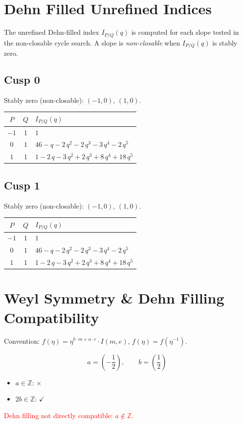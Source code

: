 \documentclass[11pt,a4paper]{article}
\begin{document}
\section{Dehn Filled Unrefined Indices}
The unrefined Dehn-filled index $I_{P/Q}(q)$ is computed for each slope tested in the non-closable cycle search.  A slope is \emph{non-closable} when $I_{P/Q}(q)$ is stably zero.

\subsection*{Cusp 0}
Stably zero (non-closable): $(-1,0)$, $(1,0)$.

\begin{longtable}{ccl}
\toprule
$P$ & $Q$ & $I_{P/Q}(q)$ \\
\midrule
\endhead
$-1$ & $1$ & $1$ \\
$0$ & $1$ & $46 - q - 2\,q^{2} - 2\,q^{3} - 3\,q^{4} - 2\,q^{5}$ \\
$1$ & $1$ & $1 - 2\,q - 3\,q^{2} + 2\,q^{3} + 8\,q^{4} + 18\,q^{5}$ \\
\bottomrule
\end{longtable}

\subsection*{Cusp 1}
Stably zero (non-closable): $(-1,0)$, $(1,0)$.

\begin{longtable}{ccl}
\toprule
$P$ & $Q$ & $I_{P/Q}(q)$ \\
\midrule
\endhead
$-1$ & $1$ & $1$ \\
$0$ & $1$ & $46 - q - 2\,q^{2} - 2\,q^{3} - 3\,q^{4} - 2\,q^{5}$ \\
$1$ & $1$ & $1 - 2\,q - 3\,q^{2} + 2\,q^{3} + 8\,q^{4} + 18\,q^{5}$ \\
\bottomrule
\end{longtable}

\section{Weyl Symmetry \& Dehn Filling Compatibility}
Convention: $f(\eta) = \eta^{b\cdot m + a\cdot e} \cdot I(m,e)$, \quad $f(\eta) = f(\eta^{-1})$.

$$a = (-\frac{1}{2}), \qquad b = (\frac{1}{2})$$

\begin{itemize}
  \item $a \in \mathbb{Z}$: $\times$
  \item $2b \in \mathbb{Z}$: $\checkmark$
\end{itemize}
\textcolor{red}{Dehn filling not directly compatible: $a \notin \mathbb{Z}$.}
\end{document}
